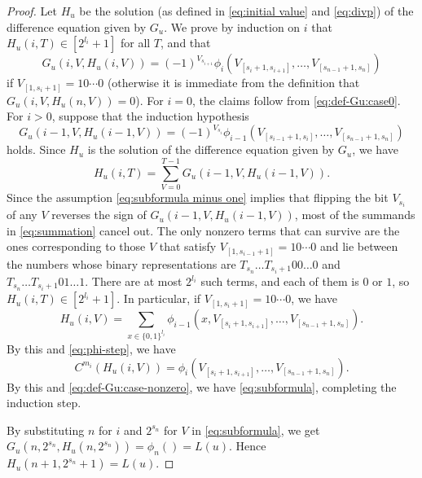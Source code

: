 \documentclass{lmcs}
\theoremstyle{definition}
\theoremstyle{remark}
\begin{document}
\begin{proof}
Let $H_u$ be the solution (as defined in 
\eqref{eq:initial value} and \eqref{eq:divp}) 
of the difference equation given by $G_u$. 
We prove by induction on $i$ 
that $H _u (i, T) \in [2^{l_i} + 1]$ for all $T$, and that 
\begin{equation} \label{eq:subformula}
  G_u(i,V,H_u(i,V)) = (-1)^{V_{s_{i+1}}} 
   \phi_i(V_{[s_i+1, s_{i+1}]}, \dots, V_{[s_{n-1}+1, s_n]})
\end{equation}
if $V_{[1, s_i +1]} = 10 \cdots 0$
(otherwise it is immediate from the definition that $G_u(i, V, H_u(n, V)) = 0$).
For $i = 0$, the claims follow from \eqref{eq:def-Gu:case0}.
For $i > 0$, suppose that the induction hypothesis
\begin{equation} \label{eq:subformula minus one}
  G _u (i - 1, V, H _u (i - 1, V)) = (-1) ^{V_{s_i}} 
   \phi _{i - 1} (V _{[s _{i - 1} + 1, s _i]}, \dots, V _{[s_{n-1}+1, s_n]}) 
\end{equation}
holds. 
Since $H _u$ is the solution of the difference equation given by $G _u$, we have
 \begin{equation} \label{eq:summation}
  H _u (i, T) 
  = \sum_{V = 0}^{T-1} G_u(i - 1, V, H_u(i - 1, V)).
 \end{equation}
Since the assumption \eqref{eq:subformula minus one} 
implies that flipping the bit $V_{s_i}$ of
any $V$ reverses the sign of $G _u (i - 1, V, H _u(i - 1, V))$,
most of the summands in \eqref{eq:summation} cancel out.
The only nonzero terms that can survive 
are the ones corresponding to those $V$ 
that satisfy $V_{[1, s_{i - 1}+1]} = 10 \cdots 0$ and
lie between 
the numbers whose binary representations are
$T_{s_n} \dots T_{s_i+1} 00 \dots 0$ and 
$T_{s_n} \dots T_{s_i+1} 01 \dots 1$. 
There are at most $2 ^{l _i}$ such terms, 
and each of them is $0$ or $1$, 
so $H _u (i, T) \in [2 ^{l _i} + 1]$.
In particular, if $V_{[1,s_i+1]} = 10 \cdots 0$, we have
 \begin{equation}
  H _u (i, V) = \sum_{x \in \{0,1\}^{l_i}}
  \phi _{i - 1} (x, V_{[s_i+1, s_{i+1}]}, \dots, V_{[s_{n-1}+1, s_n]}).
 \end{equation}
By this and \eqref{eq:phi-step}, we have 
 \begin{equation}
  C^{m_i} (H _u(i, V)) 
  = \phi _i (V_{[s_i+1, s_{i+1}]}, \dots, V_{[s_{n-1}+1, s_n]}).
\end{equation}
By this and \eqref{eq:def-Gu:case-nonzero}, we have \eqref{eq:subformula}, 
completing the induction step.

By substituting $n$ for $i$ and $2^{s_n}$ for $V$ in \eqref{eq:subformula},
we get $G_u(n, 2^{s_n}, H_u(n,2^{s_n})) = \phi_n() = L (u)$.
Hence $H_u(n+1, 2^{s_n}+1) = L (u)$.
\end{proof}
\end{document}
